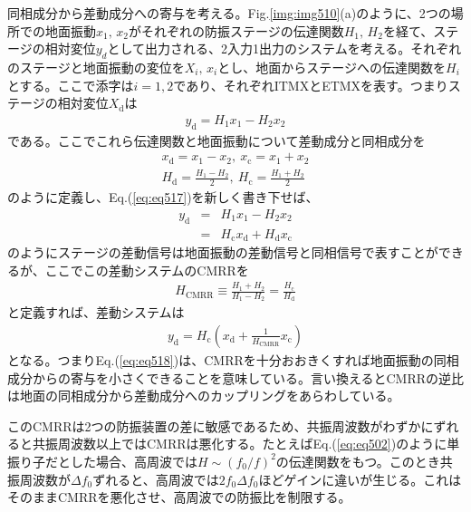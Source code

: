 同相成分から差動成分への寄与を考える。Fig.\ref{img:img510}(a)のように、2つの場所での地面振動$x_1,\,x_2$がそれぞれの防振ステージの伝達関数$H_1,\,H_2$を経て、ステージの相対変位$y_d$として出力される、2入力1出力のシステムを考える。それぞれのステージと地面振動の変位を$X_{i},\,x_{i}$とし、地面からステージへの伝達関数を$H_{i}$とする。ここで添字は$i=1,2$であり、それぞれITMXとETMXを表す。つまりステージの相対変位$X_{\mathrm{d}}$は
\begin{eqnarray}
  y_{\mathrm{d}} = H_1x_1-H_2x_2 \label{eq:eq517}
\end{eqnarray}
である。ここでこれら伝達関数と地面振動について差動成分と同相成分を
\begin{eqnarray}
  x_{\mathrm{d}} = {x_1-x_2},\ x_{\mathrm{c}} = {x_1+x_2}  \\
  H_{\mathrm{d}} = \frac{H_1-H_2}{2},\ H_{\mathrm{c}} = \frac{H_1+H_2}{2} \label{eq:eq517_a}
\end{eqnarray}
のように定義し、Eq.(\ref{eq:eq517})を新しく書き下せば、
\begin{eqnarray}
  y_{\mathrm{d}} &=& H_1x_1-H_2x_2 \\
  &=& H_{\mathrm{c}}x_{\mathrm{d}} + H_{\mathrm{d}}x_{\mathrm{c}}\label{eq:eq516}
\end{eqnarray}
のようにステージの差動信号は地面振動の差動信号と同相信号で表すことができるが、ここでこの差動システムのCMRRを
\begin{eqnarray}
  H_{\mathrm{CMRR}} \equiv \frac{H_1+H_2}{H_1-H_2}=\frac{H_{\mathrm{c}}}{H_{\mathrm{d}}} \label{eq:eq519}
\end{eqnarray}
と定義すれば、差動システムは
\begin{eqnarray}
  y_{\mathrm{d}} = H_{\mathrm{c}}\left( x_{\mathrm{d}} + \frac{1}{H_{\mathrm{CMRR}}}x_{\mathrm{c}}\right) \label{eq:eq518}
\end{eqnarray}
となる。つまりEq.(\ref{eq:eq518})は、CMRRを十分おおきくすれば地面振動の同相成分からの寄与を小さくできることを意味している。言い換えるとCMRRの逆比は地面の同相成分から差動成分へのカップリングをあらわしている。

このCMRRは2つの防振装置の差に敏感であるため、共振周波数がわずかにずれると共振周波数以上ではCMRRは悪化する。たとえばEq.(\ref{eq:eq502})のように単振り子だとした場合、高周波では$H\sim{({f_0}/{f})^2}$の伝達関数をもつ。このとき共振周波数が$\Delta{f_0}$ずれると、高周波では$2f_0\Delta{f_0}$ほどゲインに違いが生じる。これはそのままCMRRを悪化させ、高周波での防振比を制限する。


